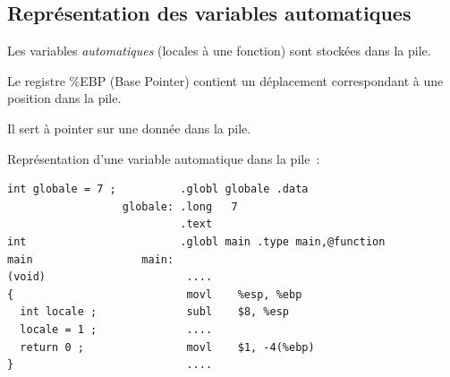 \begin{frame}[fragile]
  \section{Repr\'esentation des variables automatiques}%
  Les variables \emph{automatiques} (locales \`a une fonction) sont stock\'ees dans la pile.
  \par\smallskip
  Le registre \%EBP (Base Pointer) contient un d\'eplacement
  correspondant \`a une position dans la pile.
  \par\smallskip
  Il sert \`a pointer sur une donn\'ee dans la pile. 

        Repr\'esentation d'une variable automatique dans la pile~:
\begin{verbatim}
int globale = 7 ;          .globl globale .data                 
                  globale: .long   7                   
                           .text                        
int                        .globl main .type main,@function   
main                 main:                                
(void)                      ....                         
{                           movl    %esp, %ebp           
  int locale ;              subl    $8, %esp  
  locale = 1 ;              .... 
  return 0 ;                movl    $1, -4(%ebp)         
}                           ....                         
\end{verbatim}
\end{frame}
